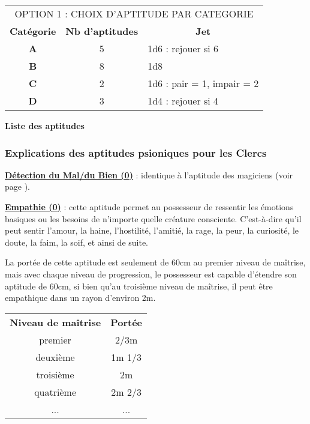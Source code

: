 \bigskip

\begin{tabular}{ccl}
\multicolumn{3}{c}{OPTION 1 : CHOIX D'APTITUDE PAR CATEGORIE} \\
\textbf{Catégorie} &  \textbf{Nb d'aptitudes} & \multicolumn{1}{c}{\textbf{Jet}} \\
\textbf{A} & 5 & 1d6 : rejouer si 6 \\
\textbf{B} & 8 & 1d8 \\
\textbf{C} & 2 & 1d6 : pair = 1, impair = 2 \\
\textbf{D} & 3 & 1d4 : rejouer si 4 \\
\end{tabular}

\bigskip

\textbf{Liste des aptitudes}

\bigskip


\subsubsection*{Explications des aptitudes psioniques pour les Clercs}

\textbf{\uline{Détection du Mal/du Bien (0)}} : identique à l'aptitude des magiciens (voir page \pageref{magicien-detection-mal}).

\bigskip

\label{clerc-empathie}\textbf{\uline{Empathie (0)}} : cette aptitude permet au possesseur de ressentir les émotions basiques ou les besoins de n'importe quelle créature consciente. C'est-à-dire qu'il peut sentir l'amour, la haine, l'hostilité, l'amitié, la rage, la peur, la curiosité, le doute, la faim, la soif, et ainsi de suite.

\bigskip

La portée de cette aptitude est seulement de 60cm au premier niveau de maîtrise, mais avec chaque niveau de progression, le possesseur est capable d'étendre son aptitude de 60cm, si bien qu'au troisième niveau de maîtrise, il peut être empathique dans un rayon d'environ 2m.

\bigskip

\begin{tabular}{cc}
\textbf{Niveau de maîtrise} & \textbf{Portée}\\
premier     & 2/3m   \\
deuxième    & 1m 1/3   \\
troisième   & 2m  \\
quatrième   & 2m 2/3 \\
...         & ...    \\
\end{tabular}

